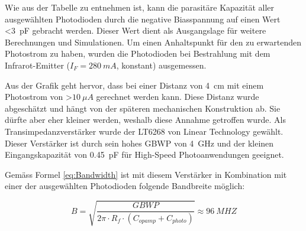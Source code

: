 Wie aus der Tabelle zu entnehmen ist, kann die parasitäre Kapazität aller ausgewählten Photodioden durch die negative Biasspannung auf einen Wert \textless \SI{3}{pF} gebracht werden. Dieser Wert dient als Ausgangslage für weitere Berechnungen und Simulationen.
\newline
Um einen Anhaltspunkt für den zu erwartenden Photostrom zu haben, wurden die Photodioden bei Bestrahlung mit dem Infrarot-Emitter ($I_{F}=\SI{280}{mA}$, konstant) ausgemessen.



Aus der Grafik geht hervor, dass bei einer Distanz von \SI{4}{cm} mit einem Photostrom von \textgreater $\SI{10}{\mu A}$ gerechnet werden kann. Diese Distanz wurde abgeschätzt und hängt von der späteren mechanischen Konstruktion ab. Sie dürfte aber eher kleiner werden, weshalb diese Annahme getroffen wurde.
\newline
Als Transimpedanzverstärker wurde der LT6268 von Linear Technology gewählt. Dieser Verstärker ist durch sein hohes GBWP von \SI{4}{GHz} und der kleinen Eingangskapazität von \SI{0.45}{pF} für High-Speed Photoanwendungen geeignet.

Gemäss Formel \ref{eq:Bandwidth} ist mit diesem Verstärker in Kombination mit einer der ausgewählten Photodioden folgende Bandbreite möglich:

\begin{equation}\label{eq:Bandwidth2}
B=\sqrt{\frac{GBWP}{2\pi\cdot R_{f}\cdot (C_{opamp}+C_{photo})}}\approx \SI{96}{MHZ}
\end{equation}

